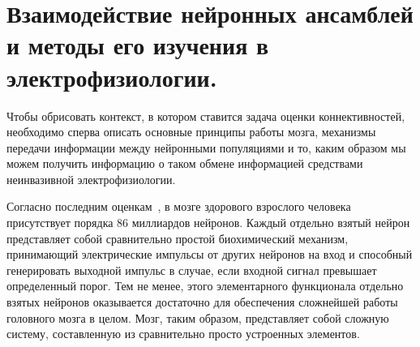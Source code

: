 \chapter{Взаимодействие нейронных ансамблей и методы его изучения в электрофизиологии.}\label{chapt1}




Чтобы обрисовать контекст, в котором ставится задача оценки коннективностей,
необходимо сперва описать основные принципы работы мозга, механизмы передачи
информации между нейронными популяциями и то, каким образом мы можем получить
информацию о таком обмене информацией средствами неинвазивной электрофизиологии.

Согласно последним оценкам~\cite{Azevedo2009}, в мозге здорового взрослого человека присутствует
порядка 86 миллиардов нейронов. Каждый отдельно взятый нейрон представляет собой
сравнительно простой биохимический механизм, принимающий электрические импульсы
от других нейронов на вход и способный генерировать выходной импульс в случае,
если входной сигнал превышает определенный порог. Тем не менее, этого элементарного
функционала отдельно взятых нейронов оказывается достаточно для обеспечения сложнейшей работы
головного мозга в целом.
Мозг, таким образом, представляет собой сложную систему, составленную из сравнительно
просто устроенных элементов.

